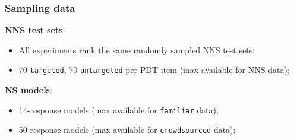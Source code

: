 \documentclass[xcolor={dvipsnames}]{beamer}
\newcommand{\param}[1]{\texttt{#1}}
\begin{document}
\begin{frame}
\frametitle{Sampling data}
\normalsize

\pause
\textbf{NNS test sets}:
\begin{itemize}
\item All experiments rank the same randomly sampled NNS test sets;
\item 70 \param{targeted}, 70 \param{untargeted} per PDT item (max available for NNS data);
\end{itemize}

\vspace{1.5em}

\pause
\textbf{NS models}:
\begin{itemize}
\item 14-response models (max available for \param{familiar} data);
\item 50-response models (max available for \param{crowdsourced} data);
\end{itemize}
\end{frame}
\end{document}
